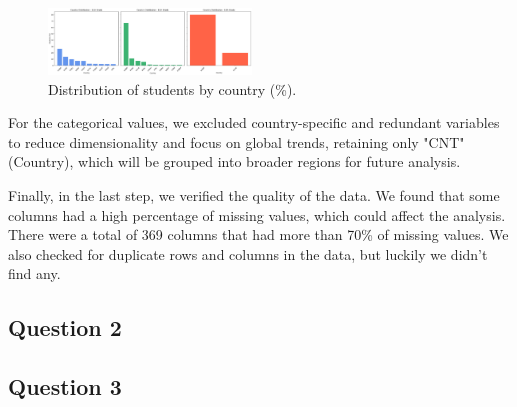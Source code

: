 \begin{figure}
    \centering
    \includegraphics[width=0.48\textwidth]{figures/Q1_CountryDistri.png}
    \caption{Distribution of students by country (\%).}
    \label{fig:country_distribution}
\end{figure}

For the categorical values, we excluded country-specific and redundant variables to reduce dimensionality and focus on global trends, retaining only "CNT" (Country), which will be grouped into broader regions for future analysis.

Finally, in the last step, we verified the quality of the data. We found that some columns had a high percentage of missing values, which could affect the analysis. There were a total of 369 columns that had more than 70\% of missing values.
We also checked for duplicate rows and columns in the data, but luckily we didn't find any.

\subsection{Question 2}

\subsection{Question 3}